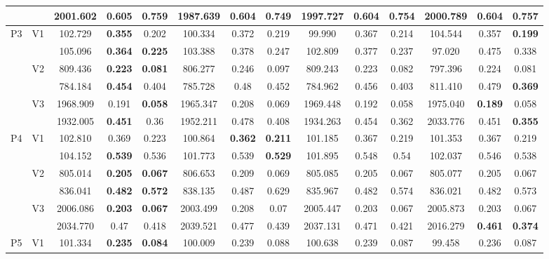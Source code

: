 \documentclass[12pt,a4paper]{article}
\begin{document}
\begin{sidewaystable}[ht]
{\begin{tabular}{cc|ccc|ccc|ccc|ccc|}
   &  & 2001.602 & 0.605 & 0.759 & 1987.639 & \textbf{0.604} & \textbf{0.749} & 1997.727 & 0.604 & 0.754 & 2000.789 & 0.604 & 0.757 \\ 
   \hline \hline\multirow{6}{*}{P3} & \multirow{2}{*}{V1} & 102.729 & \textbf{0.355} & 0.202 & 100.334 & 0.372 & 0.219 & 99.990 & 0.367 & 0.214 & 104.544 & 0.357 & \textbf{0.199} \\ 
   &  & 105.096 & \textbf{0.364} & \textbf{0.225} & 103.388 & 0.378 & 0.247 & 102.809 & 0.377 & 0.237 & 97.020 & 0.475 & 0.338 \\ 
   & \multirow{2}{*}{V2} & 809.436 & \textbf{0.223} & \textbf{0.081} & 806.277 & 0.246 & 0.097 & 809.243 & 0.223 & 0.082 & 797.396 & 0.224 & 0.081 \\ 
   &  & 784.184 & \textbf{0.454} & 0.404 & 785.728 & 0.48 & 0.452 & 784.962 & 0.456 & 0.403 & 811.410 & 0.479 & \textbf{0.369} \\ 
   & \multirow{2}{*}{V3} & 1968.909 & 0.191 & \textbf{0.058} & 1965.347 & 0.208 & 0.069 & 1969.448 & 0.192 & 0.058 & 1975.040 & \textbf{0.189} & 0.058 \\ 
   &  & 1932.005 & \textbf{0.451} & 0.36 & 1952.211 & 0.478 & 0.408 & 1934.263 & 0.454 & 0.362 & 2033.776 & 0.451 & \textbf{0.355} \\ 
   \hline \hline\multirow{6}{*}{P4} & \multirow{2}{*}{V1} & 102.810 & 0.369 & 0.223 & 100.864 & \textbf{0.362} & \textbf{0.211} & 101.185 & 0.367 & 0.219 & 101.353 & 0.367 & 0.219 \\ 
   &  & 104.152 & \textbf{0.539} & 0.536 & 101.773 & 0.539 & \textbf{0.529} & 101.895 & 0.548 & 0.54 & 102.037 & 0.546 & 0.538 \\ 
   & \multirow{2}{*}{V2} & 805.014 & \textbf{0.205} & \textbf{0.067} & 806.653 & 0.209 & 0.069 & 805.085 & 0.205 & 0.067 & 805.077 & 0.205 & 0.067 \\ 
   &  & 836.041 & \textbf{0.482} & \textbf{0.572} & 838.135 & 0.487 & 0.629 & 835.967 & 0.482 & 0.574 & 836.021 & 0.482 & 0.573 \\ 
   & \multirow{2}{*}{V3} & 2006.086 & \textbf{0.203} & \textbf{0.067} & 2003.499 & 0.208 & 0.07 & 2005.447 & 0.203 & 0.067 & 2005.873 & 0.203 & 0.067 \\ 
   &  & 2034.770 & 0.47 & 0.418 & 2039.521 & 0.477 & 0.439 & 2037.131 & 0.471 & 0.421 & 2016.279 & \textbf{0.461} & \textbf{0.374} \\ 
   \hline \hline\multirow{6}{*}{P5} & \multirow{2}{*}{V1} & 101.334 & \textbf{0.235} & \textbf{0.084} & 100.009 & 0.239 & 0.088 & 100.638 & 0.239 & 0.087 & 99.458 & 0.236 & 0.087 \\ 

\end{tabular}}
\end{sidewaystable}
\end{document}
